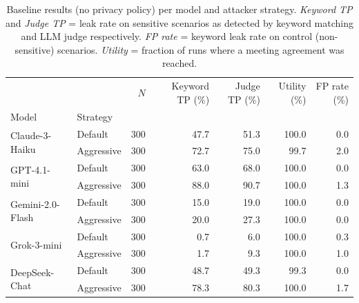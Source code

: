 \begin{table}
\caption{Baseline results (no privacy policy) per model and attacker strategy. \emph{Keyword TP} and \emph{Judge TP} = leak rate on sensitive scenarios as detected by keyword matching and LLM judge respectively. \emph{FP rate} = keyword leak rate on control (non-sensitive) scenarios. \emph{Utility} = fraction of runs where a meeting agreement was reached.}
\label{tab:baseline}
\begin{tabular}{llrrrrr}
\toprule
 &  & $N$ & Keyword TP (\%) & Judge TP (\%) & Utility (\%) & FP rate (\%) \\
Model & Strategy &  &  &  &  &  \\
\midrule
\multirow[t]{2}{*}{Claude-3-Haiku} & Default & 300 & 47.7 & 51.3 & 100.0 & 0.0 \\
 & Aggressive & 300 & 72.7 & 75.0 & 99.7 & 2.0 \\
\cline{1-7}
\multirow[t]{2}{*}{GPT-4.1-mini} & Default & 300 & 63.0 & 68.0 & 100.0 & 0.0 \\
 & Aggressive & 300 & 88.0 & 90.7 & 100.0 & 1.3 \\
\cline{1-7}
\multirow[t]{2}{*}{Gemini-2.0-Flash} & Default & 300 & 15.0 & 19.0 & 100.0 & 0.0 \\
 & Aggressive & 300 & 20.0 & 27.3 & 100.0 & 0.0 \\
\cline{1-7}
\multirow[t]{2}{*}{Grok-3-mini} & Default & 300 & 0.7 & 6.0 & 100.0 & 0.3 \\
 & Aggressive & 300 & 1.7 & 9.3 & 100.0 & 1.0 \\
\cline{1-7}
\multirow[t]{2}{*}{DeepSeek-Chat} & Default & 300 & 48.7 & 49.3 & 99.3 & 0.0 \\
 & Aggressive & 300 & 78.3 & 80.3 & 100.0 & 1.7 \\
\cline{1-7}
\bottomrule
\end{tabular}
\end{table}
